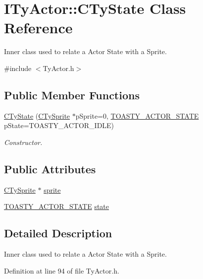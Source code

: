 \hypertarget{class_i_ty_actor_1_1_c_ty_state}{
\section{ITyActor::CTyState Class Reference}
\label{class_i_ty_actor_1_1_c_ty_state}
}


Inner class used to relate a Actor State with a Sprite.  




{\ttfamily \#include $<$TyActor.h$>$}

\subsection*{Public Member Functions}
\begin{DoxyCompactItemize}
\item 
\hyperlink{class_i_ty_actor_1_1_c_ty_state_a1df8c1e0a888f227fccc4713262b8f29}{CTyState} (\hyperlink{class_c_ty_sprite}{CTySprite} $\ast$pSprite=0, \hyperlink{_ty_actor_8h_aceba83227db82b051b04ff8e90d63a51}{TOASTY\_\-ACTOR\_\-STATE} pState=TOASTY\_\-ACTOR\_\-IDLE)
\begin{DoxyCompactList}\small\item\em Constructor. \end{DoxyCompactList}\end{DoxyCompactItemize}
\subsection*{Public Attributes}
\begin{DoxyCompactItemize}
\item 
\hyperlink{class_c_ty_sprite}{CTySprite} $\ast$ \hyperlink{class_i_ty_actor_1_1_c_ty_state_ac323a9bfa3ec7cca1b95c3be92de5da1}{sprite}
\item 
\hyperlink{_ty_actor_8h_aceba83227db82b051b04ff8e90d63a51}{TOASTY\_\-ACTOR\_\-STATE} \hyperlink{class_i_ty_actor_1_1_c_ty_state_ad744ea8266eddb703ed954daa1c3194b}{state}
\end{DoxyCompactItemize}


\subsection{Detailed Description}
Inner class used to relate a Actor State with a Sprite. 

Definition at line 94 of file TyActor.h.



